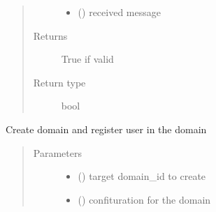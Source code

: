 \documentclass[letterpaper,10pt,english]{sphinxmanual}
\begin{document}
\begin{fulllineitems}
\begin{fulllineitems}
\begin{quote}
\begin{description}
\begin{itemize}
\item {} 
 () \textendash{} received message

\end{itemize}

\item[{Returns}] \leavevmode
True if valid

\item[{Return type}] \leavevmode
bool

\end{description}\end{quote}

\end{fulllineitems}


\begin{fulllineitems}
\label{\detokenize{bbc1.core.bbc_network:bbc1.core.bbc_network.BBcNetwork.create_domain}}
Create domain and register user in the domain
\begin{quote}\begin{description}
\item[{Parameters}] \leavevmode\begin{itemize}
\item {} 
 () \textendash{} target domain\_id to create

\item {} 
 () \textendash{} confituration for the domain

\end{itemize}


\end{description}
\end{quote}
\end{fulllineitems}
\end{fulllineitems}
\end{document}
